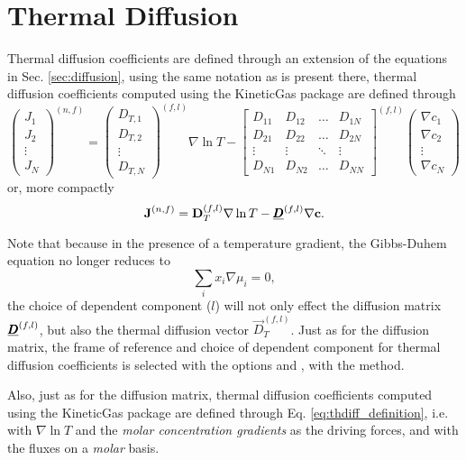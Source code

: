 \section{Thermal Diffusion}

Thermal diffusion coefficients are defined through an extension of the equations in Sec. \ref{sec:diffusion}, using the same notation as is present there, thermal diffusion coefficients computed using the KineticGas package are defined through
\begin{equation}
    \begin{pmatrix}J_1 \\ J_2 \\ \vdots \\ J_N \end{pmatrix}^{(n, f)} = 
    \begin{pmatrix}
    D_{T,1} \\ D_{T,2} \\ \vdots \\ D_{T,N}    
    \end{pmatrix}^{(f, l)} \nabla \ln T -
    \begin{bmatrix}
    D_{11} & D_{12} & \hdots & D_{1N} \\
    D_{21} & D_{22} & \hdots & D_{2N} \\
    \vdots & \vdots & \ddots & \vdots \\
    D_{N1} & D_{N2} & \hdots & D_{NN}
    \end{bmatrix}^{(f, l)}
    \begin{pmatrix}\nabla c_1 \\ \nabla c_2 \\ \vdots \\ \nabla c_N \end{pmatrix}
    \label{eq:thdiff_definition}
\end{equation}
or, more compactly
\begin{equation}
    \boldsymbol{\mathrm{J}}^{(n, f)} = \boldsymbol{\mathrm{D}}_T^{(f, l)} \nabla \ln T - \underline{\pmb{D}}^{(f, l)} \nabla \boldsymbol{\mathrm{c}}.
\end{equation}

Note that because in the presence of a temperature gradient, the Gibbs-Duhem equation no longer reduces to 
\begin{equation}
    \sum_i x_i \nabla \mu_i = 0,
\end{equation}
the choice of dependent component ($l$) will not only effect the diffusion matrix $\underline{\pmb{D}}^{(f, l)}$, but also the thermal diffusion vector $\Vec{D}_T^{(f, l)}$. Just as for the diffusion matrix, the frame of reference and choice of dependent component for thermal diffusion coefficients is selected with the options  and , with the  method. 

Also, just as for the diffusion matrix, thermal diffusion coefficients computed using the KineticGas package are defined through Eq. \eqref{eq:thdiff_definition}, i.e. with $\nabla \ln T$ and the \textit{molar concentration gradients} as the driving forces, and with the fluxes on a \textit{molar} basis.
